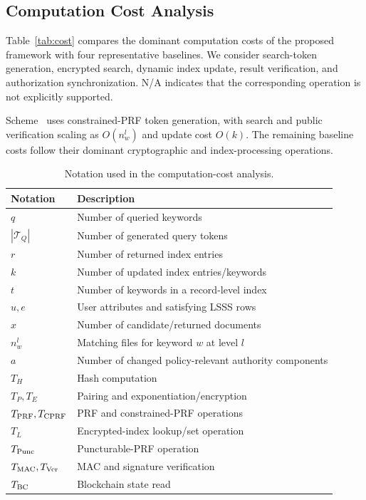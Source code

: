 \documentclass{ieeetj}
\theoremstyle{ieee-style}
\begin{document}
\subsection{Computation Cost Analysis}

Table~\ref{tab:cost} compares the dominant computation costs of the
proposed framework with four representative baselines. We consider
search-token generation, encrypted search, dynamic index update,
result verification, and authorization synchronization. N/A indicates
that the corresponding operation is not explicitly supported.

Scheme~\cite{ref30} uses constrained-PRF token generation, with search
and public verification scaling as $O(n_w^l)$ and update cost $O(k)$.
The remaining baseline costs follow their dominant cryptographic and
index-processing operations.

\begin{table}[t]
\centering
\caption{Notation used in the computation-cost analysis.}
\label{tab:cost-notation}
\renewcommand{\arraystretch}{1.05}
\setlength{\tabcolsep}{4pt}
\begin{tabular}{ll}
\hline
\textbf{Notation} & \textbf{Description} \\
\hline
$q$ & Number of queried keywords \\
$|\mathcal{T}_Q|$ & Number of generated query tokens \\
$r$ & Number of returned index entries \\
$k$ & Number of updated index entries/keywords \\
$t$ & Number of keywords in a record-level index \\
$u,e$ & User attributes and satisfying LSSS rows \\
$x$ & Number of candidate/returned documents \\
$n_w^l$ & Matching files for keyword $w$ at level $l$ \\
$a$ & Number of changed policy-relevant authority components \\
\hline
$T_H$ & Hash computation \\
$T_P,T_E$ & Pairing and exponentiation/encryption \\
$T_{\rm PRF},T_{\rm CPRF}$ & PRF and constrained-PRF operations \\
$T_L$ & Encrypted-index lookup/set operation \\
$T_{\rm Punc}$ & Puncturable-PRF operation \\
$T_{\rm MAC},T_{\rm Ver}$ & MAC and signature verification \\
$T_{\rm BC}$ & Blockchain state read \\
\hline
\end{tabular}
\end{table}
\end{document}
